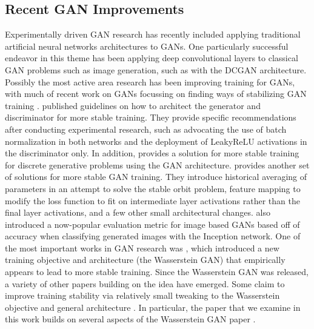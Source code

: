 \documentclass{article}
\begin{document}
\subsection{Recent GAN Improvements}
Experimentally driven GAN research has recently included applying traditional artificial neural networks architectures to GANs. One particularly successful endeavor in this theme has been applying deep convolutional layers to classical GAN problems such as image generation, such as with the DCGAN architecture. Possibly the most active area research has been improving training for GANs, with much of recent work on GANs focussing on finding ways of stabilizing GAN training \citep{Salimans2016} \citep{DBLP:journals/corr/ArjovskyCB17} \citep{DBLP:conf/nips/NowozinCT16} \citep{DBLP:journals/corr/MetzPPS16}. \citet{DBLP:journals/corr/RadfordMC15} published guidelines on how to architect the generator and discriminator for more stable training. They provide specific recommendations after conducting experimental research, such as advocating the use of batch normalization in both networks and the deployment of LeakyReLU activations in the discriminator only. In addition, \citet{DBLP:journals/corr/HjelmJCCB17} provides a solution for more stable training for discrete generative problems using the GAN architecture. \citet{Salimans2016} provides another set of solutions for more stable GAN training. They introduce historical averaging of parameters in an attempt to solve the stable orbit problem, feature mapping to modify the loss function to fit on intermediate layer activations rather than the final layer activations, and a few other small architectural changes. \citet{Salimans2016} also introduced a now-popular evaluation metric for image based GANs based off of accuracy when classifying generated images with the Inception network. One of the most important works in GAN research was \citet{DBLP:journals/corr/ArjovskyCB17}, which introduced a new training objective and architecture (the Wasserstein GAN) that empirically appears to lead to more stable training. Since the Wasserstein GAN was released, a variety of other papers building on the idea have emerged. Some claim to improve training stability via relatively small tweaking to the Wasserstein objective and general architecture \citep{DBLP:journals/corr/GulrajaniAADC17}. In particular, the paper that we examine in this work builds on several aspects of the Wasserstein GAN paper \citep{Arora17}. 
\end{document}
